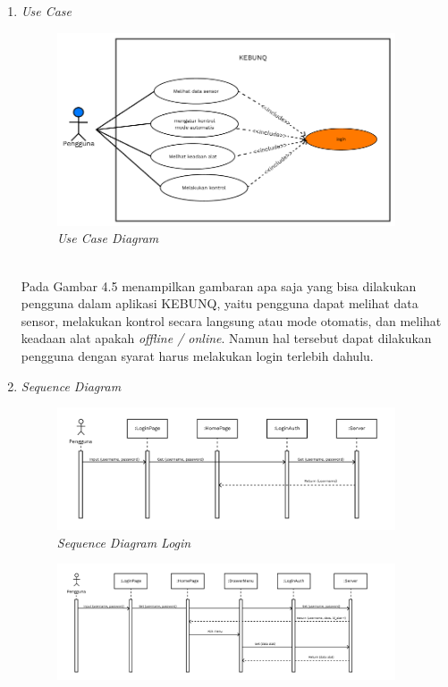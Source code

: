 \begin{flushleft}
\begin{justify}
\begin{enumerate}[label=\alph*.]
            \item \textit{Use Case}
            \begin{figure}[ht]
                \centering
                \includegraphics[width=10cm]{images/bab 4/use-case-user.png}
                \caption{\textit{Use Case Diagram}}
            \end{figure}
            \\Pada Gambar 4.5 menampilkan gambaran apa saja yang bisa dilakukan pengguna dalam aplikasi KEBUNQ, yaitu pengguna dapat melihat data sensor,
            melakukan kontrol secara langsung atau mode otomatis, dan melihat keadaan alat apakah \emph{offline / online}. Namun hal tersebut dapat dilakukan pengguna dengan syarat harus melakukan
            login terlebih dahulu.
            \item \textit{Sequence Diagram}
            \begin{figure}[ht]
                \centering
                \includegraphics[width=10cm]{images/bab 4/Sequence login.png}
                \caption{\textit{Sequence Diagram Login}}
            \end{figure}
            \begin{figure}[ht]
                \centering
                \includegraphics[width=10cm]{images/bab 4/buka menu alat.png}

\end{figure}
\end{enumerate}
\end{justify}
\end{flushleft}
